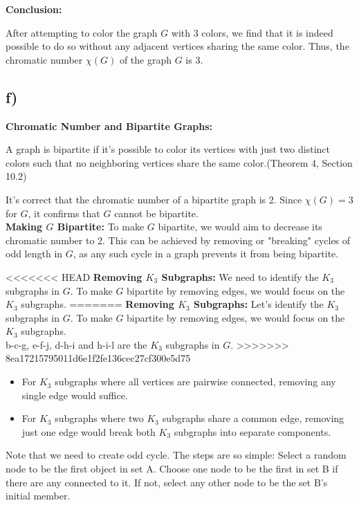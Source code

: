 \documentclass[12pt]{article}
\begin{document}
\textbf{Conclusion:}

After attempting to color the graph \( G \) with 3 colors, we find that it is indeed possible to do so without any adjacent vertices sharing the same color. Thus, the chromatic number \( \chi(G) \) of the graph \( G \) is 3.


\subsection*{f)}

\textbf{Chromatic Number and Bipartite Graphs:} 


A graph is bipartite if it's possible to color its vertices with just two distinct colors such that no neighboring vertices share the same color.(Theorem 4, Section 10.2)

It's correct that the chromatic number of a bipartite graph is 2. Since \( \chi(G) = 3 \) for \( G \), it confirms that \( G \) cannot be bipartite.\\

\textbf{Making \( G \) Bipartite:} To make \( G \) bipartite, we would aim to decrease its chromatic number to 2. This can be achieved by removing or "breaking" cycles of odd length in \( G \), as any such cycle in a graph prevents it from being bipartite.

<<<<<<< HEAD
\textbf{Removing \( K_3 \) Subgraphs:} We need to identify the \( K_3 \) subgraphs in \( G \). To make \( G \) bipartite by removing edges, we would focus on the \( K_3 \) subgraphs.
=======
\textbf{Removing \( K_3 \) Subgraphs:} Let's identify the \( K_3 \) subgraphs in \( G \). To make \( G \) bipartite by removing edges, we would focus on the \( K_3 \) subgraphs.\\

b-c-g, e-f-j, d-h-i and h-i-l are the \( K_3 \) subgraphs in \( G \).
>>>>>>> 8ea17215795011d6e1f2fe136cec27cf300e5d75

\begin{itemize}
    \item For \( K_3 \) subgraphs where all vertices are pairwise connected, removing any single edge would suffice.
    
    \item For \( K_3 \) subgraphs where two \( K_3 \) subgraphs share a common edge, removing just one edge would break both \( K_3 \) subgraphs into separate components.
\end{itemize}

Note that we need to create odd cycle.
The steps are so simple:
Select a random node to be the first object in set A. Choose one node to be the first in set B if there are any connected to it. If not, select any other node to be the set B's initial member.
\end{document}
